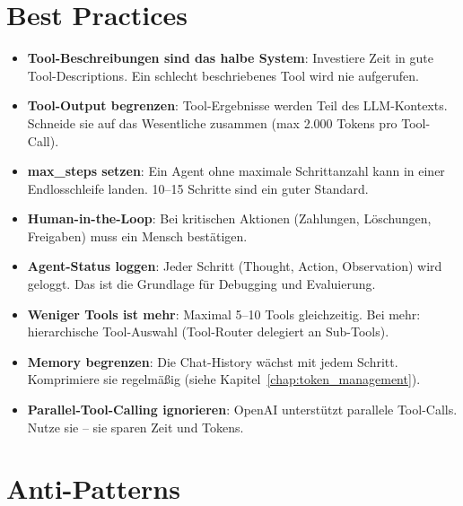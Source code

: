 \section{Best Practices}

\begin{itemize}[leftmargin=*]
    \item \textbf{Tool-Beschreibungen sind das halbe System}: Investiere Zeit in gute Tool-Descriptions. Ein schlecht beschriebenes Tool wird nie aufgerufen.
    \item \textbf{Tool-Output begrenzen}: Tool-Ergebnisse werden Teil des LLM-Kontexts. Schneide sie auf das Wesentliche zusammen (max 2.000 Tokens pro Tool-Call).
    \item \textbf{max\_steps setzen}: Ein Agent ohne maximale Schrittanzahl kann in einer Endlosschleife landen. 10--15 Schritte sind ein guter Standard.
    \item \textbf{Human-in-the-Loop}: Bei kritischen Aktionen (Zahlungen, Löschungen, Freigaben) muss ein Mensch bestätigen.
    \item \textbf{Agent-Status loggen}: Jeder Schritt (Thought, Action, Observation) wird geloggt. Das ist die Grundlage für Debugging und Evaluierung.
    \item \textbf{Weniger Tools ist mehr}: Maximal 5--10 Tools gleichzeitig. Bei mehr: hierarchische Tool-Auswahl (Tool-Router delegiert an Sub-Tools).
    \item \textbf{Memory begrenzen}: Die Chat-History wächst mit jedem Schritt. Komprimiere sie regelmäßig (siehe Kapitel~\ref{chap:token_management}).
    \item \textbf{Parallel-Tool-Calling ignorieren}: OpenAI unterstützt parallele Tool-Calls. Nutze sie -- sie sparen Zeit und Tokens.
\end{itemize}

\section{Anti-Patterns}

